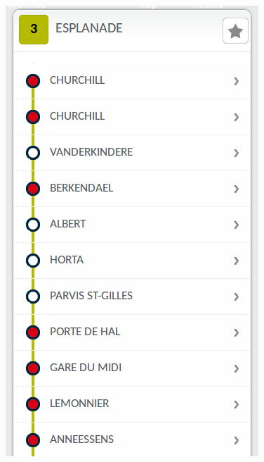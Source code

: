 \documentclass[11pt]{article}%
\begin{document}
\begin{minipage}{0.25\textwidth}
  \begin{figure}[H]
    \center
    \includegraphics[width=\textwidth]{stibmobile.png}
  \end{figure}
\end{minipage}\hfill
\end{document}
